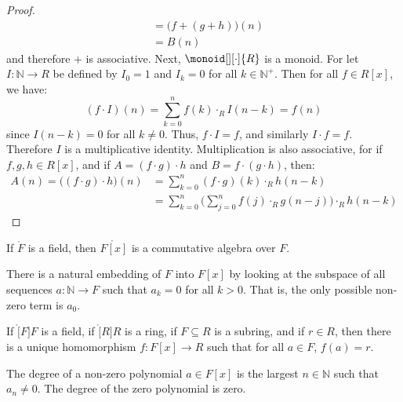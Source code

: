 \documentclass{article}                                                        %
\begin{document}
\begin{proof}
\begin{subequations}
\begin{align}
                        &=\big(f+(g+h)\big)(n)\\
                        &=B(n)
                \end{align}
            \end{subequations}
            and therefore $+$ is associative. Next, $\monoid[][\cdot]{R}$ is a
            monoid. For let $I:\mathbb{N}\rightarrow{R}$ be defined
            by $I_{0}=1$ and $I_{k}=0$ for all $k\in\mathbb{N}^{+}$. Then for
            all $f\in{R}[x]$, we have:
            \begin{equation}
                (f\cdot{I})(n)=\sum_{k=0}^{n}f(k)\cdot_{R}I(n-k)
                =f(n)
            \end{equation}
            since $I(n-k)=0$ for all $k\ne{0}$. Thus, $f\cdot{I}=f$, and
            similarly $I\cdot{f}=f$. Therefore $I$ is a multiplicative identity.
            Multiplication is also associative, for if $f,g,h\in{R}[x]$, and if
            $A=(f\cdot{g})\cdot{h}$ and $B=f\cdot(g\cdot{h})$, then:
            \begin{subequations}
                \begin{align}
                    A(n)=\big((f\cdot{g})\cdot{h}\big)(n)
                    &=\sum_{k=0}^{n}(f\cdot{g})(k)\cdot_{R}h(n-k)\\
                    &=\sum_{k=0}^{n}\Big(\sum_{j=0}^{n}f(j)\cdot_{R}g(n-j)\Big)
                        \cdot_{R}h(n-k)
                \end{align}
            \end{subequations}
        \end{proof}
        \begin{theorem}
            If $\ring{F}$ is a field, then $\ring{F[x]}$ is a commutative
            algebra over $F$.
        \end{theorem}
        There is a natural embedding of $F$ into $F[x]$ by looking at the
        subspace of all sequences $a:\mathbb{N}\rightarrow{F}$ such that
        $a_{k}=0$ for all $k>0$. That is, the only possible non-zero term is
        $a_{0}$.
        \begin{theorem}
            If $\ring[F]{F}$ is a field, if $\ring[R]{R}$ is a ring, if
            $F\subseteq{R}$ is a subring, and if $r\in{R}$, then there is a
            unique homomorphism $f:F[x]\rightarrow{R}$ such that for all
            $a\in{F}$, $f(a)=r$.
        \end{theorem}
        \begin{definition}
            The degree of a non-zero polynomial $a\in{F}[x]$ is the largest
            $n\in\mathbb{N}$ such that $a_{n}\ne{0}$. The degree of the zero
            polynomial is zero.
        \end{definition}
\end{document}
